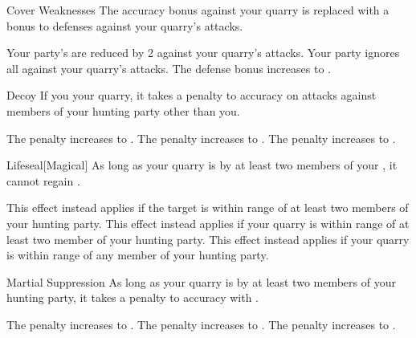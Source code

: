 {            \begin{freeability}{Cover Weaknesses}
                The accuracy bonus against your quarry is replaced with a  bonus to defenses against your quarry's attacks.

                \rankline
                 Your party's  are reduced by 2 against your quarry's attacks.
                 Your party ignores all  against your quarry's attacks.
                 The defense bonus increases to .
            \end{freeability}

            \begin{freeability}{Decoy}
                If you  your quarry, it takes a  penalty to accuracy on attacks against members of your hunting party other than you.

                \rankline
                 The penalty increases to .
                 The penalty increases to .
                 The penalty increases to .
            \end{freeability}

            \begin{freeability}{Lifeseal}[Magical]
                As long as your quarry is  by at least two members of your , it cannot regain .

                \rankline
                 This effect instead applies if the target is within \rngmed range of at least two members of your hunting party.
                 This effect instead applies if your quarry is within \rnglong range of at least two member of your hunting party.
                 This effect instead applies if your quarry is within \rnglong range of any member of your hunting party.
            \end{freeability}

            \begin{freeability}{Martial Suppression}
                As long as your quarry is  by at least two members of your hunting party, it takes a  penalty to accuracy with .

                \rankline
                 The penalty increases to .
                 The penalty increases to .
                 The penalty increases to .
            \end{freeability}

}
